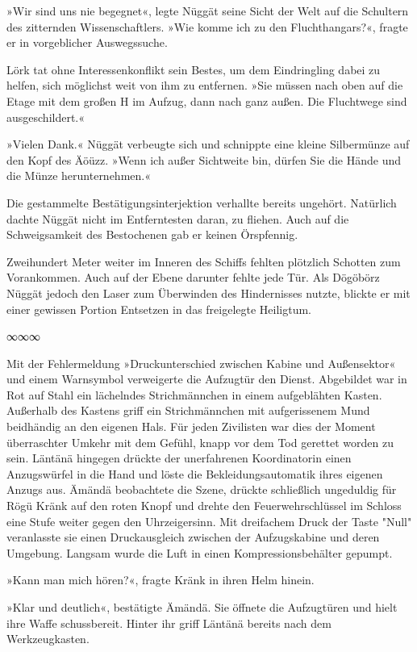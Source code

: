 »Wir sind uns nie begegnet«, legte Nüggät seine Sicht der Welt auf die Schultern des zitternden Wissenschaftlers. »Wie komme ich zu den Fluchthangars?«, fragte er in vorgeblicher Auswegssuche.

Lörk tat ohne Interessenkonflikt sein Bestes, um dem Eindringling dabei zu helfen, sich möglichst weit von ihm zu entfernen. »Sie müssen nach oben auf die Etage mit dem großen H im Aufzug, dann nach ganz außen. Die Fluchtwege sind ausgeschildert.«

»Vielen Dank.« Nüggät verbeugte sich und schnippte eine kleine Silbermünze auf den Kopf des Äöüzz. »Wenn ich außer Sichtweite bin, dürfen Sie die Hände und die Münze herunternehmen.«

Die gestammelte Bestätigungsinterjektion verhallte bereits ungehört. Natürlich dachte Nüggät nicht im Entferntesten daran, zu fliehen. Auch auf die Schweigsamkeit des Bestochenen gab er keinen Örspfennig.

Zweihundert Meter weiter im Inneren des Schiffs fehlten plötzlich Schotten zum Vorankommen. Auch auf der Ebene darunter fehlte jede Tür. Als Dögöbörz Nüggät jedoch den Laser zum Überwinden des Hindernisses nutzte, blickte er mit einer gewissen Portion Entsetzen in das freigelegte Heiligtum.

\begin{center}
∞∞∞
\end{center}

Mit der Fehlermeldung »Druckunterschied zwischen Kabine und Außensektor« und einem Warnsymbol verweigerte die Aufzugtür den Dienst. Abgebildet war in Rot auf Stahl ein lächelndes Strichmännchen in einem aufgeblähten Kasten. Außerhalb des Kastens griff ein Strichmännchen mit aufgerissenem Mund beidhändig an den eigenen Hals. Für jeden Zivilisten war dies der Moment überraschter Umkehr mit dem Gefühl, knapp vor dem Tod gerettet worden zu sein. Läntänä hingegen drückte der unerfahrenen Koordinatorin einen Anzugswürfel in die Hand und löste die Bekleidungsautomatik ihres eigenen Anzugs aus. Ämändä beobachtete die Szene, drückte schließlich ungeduldig für Rögü Kränk auf den roten Knopf und drehte den Feuerwehrschlüssel im Schloss eine Stufe weiter gegen den Uhrzeigersinn. Mit dreifachem Druck der Taste "Null" veranlasste sie einen Druckausgleich zwischen der Aufzugskabine und deren Umgebung. Langsam wurde die Luft in einen Kompressionsbehälter gepumpt.

»Kann man mich hören?«, fragte Kränk in ihren Helm hinein.

»Klar und deutlich«, bestätigte Ämändä. Sie öffnete die Aufzugtüren und hielt ihre Waffe schussbereit. Hinter ihr griff Läntänä bereits nach dem Werkzeugkasten.

